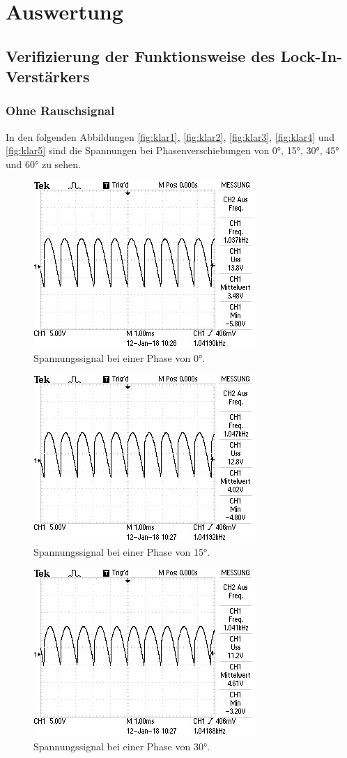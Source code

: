 \pagebreak
\section{Auswertung}

\subsection{Verifizierung der Funktionsweise des Lock-In-Verstärkers}
\subsubsection{Ohne Rauschsignal}
In den folgenden Abbildungen \eqref{fig:klar1}, \eqref{fig:klar2}, \eqref{fig:klar3}, \eqref{fig:klar4} und \eqref{fig:klar5} sind die Spannungen bei Phasenverschiebungen von 0°, 15°, 30°, 45° und 60° zu sehen. 

\begin{figure}[h!tbp]
	\centering
	\includegraphics[angle=-90, width=0.5\linewidth]{klar1.jpeg}
	\caption{Spannungssignal bei einer Phase von 0°. }
	\label{fig:klar1}
\end{figure}

\begin{figure}[h!tbp]
	\centering
	\includegraphics[angle=-90, width=0.5\linewidth]{klar2.jpeg}
	\caption{Spannungssignal bei einer Phase von 15°. }
	\label{fig:klar2}
\end{figure}

\begin{figure}[h!tbp]
	\centering
	\includegraphics[angle=-90, width=0.5\linewidth]{klar3.jpeg}
	\caption{Spannungssignal bei einer Phase von 30°. }
	\label{fig:klar3}
\end{figure}

